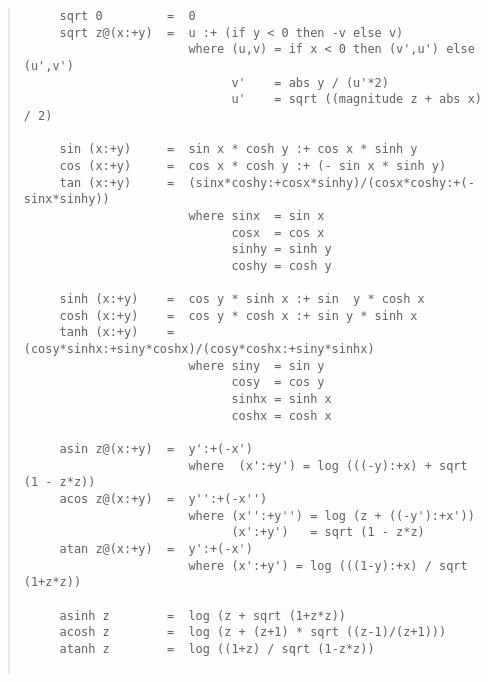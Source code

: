 \begin{quote}
{\begin{verbatim}
     sqrt 0         =  0
     sqrt z@(x:+y)  =  u :+ (if y < 0 then -v else v)
                       where (u,v) = if x < 0 then (v',u') else (u',v')
                             v'    = abs y / (u'*2)
                             u'    = sqrt ((magnitude z + abs x) / 2)
 
     sin (x:+y)     =  sin x * cosh y :+ cos x * sinh y
     cos (x:+y)     =  cos x * cosh y :+ (- sin x * sinh y)
     tan (x:+y)     =  (sinx*coshy:+cosx*sinhy)/(cosx*coshy:+(-sinx*sinhy))
                       where sinx  = sin x
                             cosx  = cos x
                             sinhy = sinh y
                             coshy = cosh y
 
     sinh (x:+y)    =  cos y * sinh x :+ sin  y * cosh x
     cosh (x:+y)    =  cos y * cosh x :+ sin y * sinh x
     tanh (x:+y)    =  (cosy*sinhx:+siny*coshx)/(cosy*coshx:+siny*sinhx)
                       where siny  = sin y
                             cosy  = cos y
                             sinhx = sinh x
                             coshx = cosh x
 
     asin z@(x:+y)  =  y':+(-x')
                       where  (x':+y') = log (((-y):+x) + sqrt (1 - z*z))
     acos z@(x:+y)  =  y'':+(-x'')
                       where (x'':+y'') = log (z + ((-y'):+x'))
                             (x':+y')   = sqrt (1 - z*z)
     atan z@(x:+y)  =  y':+(-x')
                       where (x':+y') = log (((1-y):+x) / sqrt (1+z*z))
 
     asinh z        =  log (z + sqrt (1+z*z))
     acosh z        =  log (z + (z+1) * sqrt ((z-1)/(z+1)))
     atanh z        =  log ((1+z) / sqrt (1-z*z))
 
\end{verbatim}}
\end{quote}

